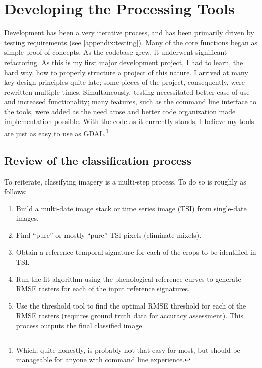 \chapter{Developing the Processing Tools}
\label{appendix:tools}

Development has been a very iterative process, and has been primarily driven by testing requirements (see \autoref{appendix:testing}). Many of the core functions began as simple proof-of-concepts. As the codebase grew, it underwent significant refactoring. As this is my first major development project, I had to learn, the hard way, how to properly structure a project of this nature. I arrived at many key design principles quite late; some pieces of the project, consequently, were rewritten multiple times. Simultaneously, testing necessitated better ease of use and increased functionality; many features, such as the command line interface to the tools, were added as the need arose and better code organization made implementation possible. With the code as it currently stands, I believe my tools are just as easy to use as GDAL.\footnote{Which, quite honestly, is probably not that easy for most, but should be manageable for anyone with command line experience.}

\section{Review of the classification process}

To reiterate, classifying imagery is a multi-step process. To do so is roughly as follows:

\begin{Spacing}{1.2}
\begin{enumerate}
  \item Build a multi-date image stack or time series image (TSI) from single-date images.
  \item Find ``pure'' or mostly ``pure'' TSI pixels (eliminate mixels).
  \item Obtain a reference temporal signature for each of the crops to be identified in TSI.
  \item Run the fit algorithm using the phenological reference curves to generate RMSE rasters for each of the input reference signatures.
  \item Use the threshold tool to find the optimal RMSE threshold for each of the RMSE rasters (requires ground truth data for accuracy assessment). This process outputs the final classified image.
\end{enumerate}
\end{Spacing}


